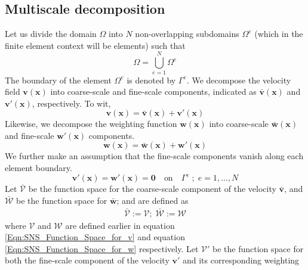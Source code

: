 \documentclass[11pt]{amsart}
\begin{document}
\subsection{Multiscale decomposition}
Let us divide the domain $\Omega$ into $N$ non-overlapping subdomains 
$\Omega^e$ (which in the finite element context will be elements) such 
that
\begin{equation}
  \Omega = \overset{N}{\underset{e = 1}{\bigcup}} \Omega^{e}
\end{equation}
The boundary of the element $\Omega^{e}$ is denoted by $\Gamma^{e}$. We 
decompose the velocity field $\boldsymbol{v}(\boldsymbol{x})$ into 
coarse-scale and fine-scale components, indicated as $\bar{\boldsymbol{v}}
(\boldsymbol{x})$ and $\boldsymbol{v}'(\boldsymbol{x})$, respectively. 
To wit, 
\begin{equation}
  \label{Eqn:SNS_Decompose_v}
  \boldsymbol{v}(\boldsymbol{x}) = \bar{\boldsymbol{v}} 
  (\boldsymbol{x}) + \boldsymbol{v}'(\boldsymbol{x})
\end{equation}
Likewise, we decompose the weighting function $\boldsymbol{w}(\boldsymbol{x})$ 
into coarse-scale $\bar{\boldsymbol{w}}(\boldsymbol{x})$ and fine-scale 
$\boldsymbol{w}'(\boldsymbol{x})$ components.
\begin{equation}
  \label{Eqn:SNS_Decompose_w}
  \boldsymbol{w}(\boldsymbol{x}) = \bar{\boldsymbol{w}}(\boldsymbol{x}) 
  + \boldsymbol{w}'(\boldsymbol{x})
\end{equation}
We further make an assumption that the fine-scale 
components vanish along each element boundary.
\begin{equation}
  \label{Eqn:SNS_Fine_Scale_Vanish}
  \boldsymbol{v}'(\boldsymbol{x}) = \boldsymbol{w}'(\boldsymbol{x}) 
  = \boldsymbol{0} \quad \mbox{on} \quad \Gamma^{e} \; ; \; e = 1, \ldots, N
\end{equation}
Let $\bar{\mathcal{V}}$ be the function space for the coarse-scale component 
of the velocity $\bar{\boldsymbol{v}}$, and $\bar{\mathcal{W}}$ be the 
function space for $\bar{\boldsymbol{w}}$; and are defined as 
\begin{align}
  \bar{\mathcal{V}} := \mathcal{V}; \;
  \bar{\mathcal{W}} := \mathcal{W}
\end{align}
where $\mathcal{V}$ and $\mathcal{W}$ are defined earlier in equation 
\eqref{Eqn:SNS_Function_Space_for_v} and equation \eqref{Eqn:SNS_Function_Space_for_w} 
respectively. Let $\mathcal{V}'$ be the function space for both the fine-scale 
component of the velocity $\boldsymbol{v}'$ and its corresponding weighting 
\end{document}
